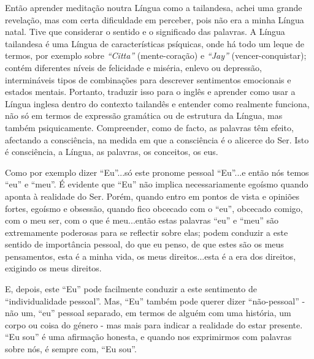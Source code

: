 Então aprender meditação noutra Língua como a tailandesa, achei uma
grande revelação, mas com certa dificuldade em perceber, pois não era a
minha Língua natal. Tive que considerar o sentido e o significado das
palavras. A Língua tailandesa é uma Língua de características psíquicas,
onde há todo um leque de termos, por exemplo sobre \emph{``Citta''}
(mente-coração) e \emph{``Jay''} (vencer-conquistar); contém diferentes
níveis de felicidade e miséria, enlevo ou depressão, intermináveis tipos
de combinações para descrever sentimentos emocionais e estados mentais.
Portanto, traduzir isso para o inglês e aprender como usar a Língua
inglesa dentro do contexto tailandês e entender como realmente funciona,
não só em termos de expressão gramática ou de estrutura da Língua, mas
também psiquicamente. Compreender, como de facto, as palavras têm
efeito, afectando a consciência, na medida em que a consciência é o
alicerce do Ser. Isto é consciência, a Língua, as palavras, os
conceitos, os eus.

Como por exemplo dizer ``Eu''...só este pronome pessoal ``Eu''...e então
nós temos ``eu'' e ``meu''. É evidente que ``Eu'' não implica
necessariamente egoísmo quando aponta à realidade do Ser. Porém, quando
entro em pontos de vista e opiniões fortes, egoísmo e obsessão, quando
fico obcecado com o ``eu'', obcecado comigo, com o meu ser, com o que é
meu...então estas palavras ``eu'' e ``meu'' são extremamente poderosas
para se reflectir sobre elas; podem conduzir a este sentido de
importância pessoal, do que eu penso, de que estes são os meus
pensamentos, esta é a minha vida, os meus direitos...esta é a era dos
direitos, exigindo os meus direitos.

E, depois, este ``Eu'' pode facilmente conduzir a este sentimento de
``individualidade pessoal''. Mas, ``Eu'' também pode querer dizer
``não-pessoal'' - não um, ``eu'' pessoal separado, em termos de alguém
com uma história, um corpo ou coisa do género - mas mais para indicar a
realidade do estar presente. ``Eu sou'' é uma afirmação honesta, e
quando nos exprimirmos com palavras sobre nós, é sempre com, ``Eu sou''.

